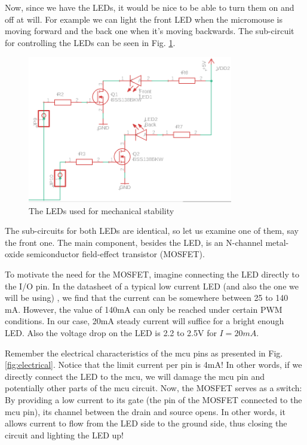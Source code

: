 Now, since we have the LEDs, it would be nice to be able to turn them on and off at will. For example we can light the front LED when the micromouse is moving forward and the back one when it's moving backwards.
The sub-circuit for controlling the LEDs can be seen in Fig. \ref{fig:leds}.

\begin{figure}[htb]
    \centering
    \includegraphics[width=0.8\textwidth]{figures/hardware/LEDs.PNG}
    \caption{The LEDs used for mechanical stability}
    \label{fig:leds}
\end{figure}

\FloatBarrier
\noindent
The sub-circuits for both LEDs are identical, so let us examine one of them, say the front one. The main component, besides the LED, is an N-channel metal-oxide semiconductor field-effect transistor (MOSFET).

To motivate the need for the MOSFET, imagine connecting the LED directly to the I/O pin. In the datasheet of a typical low current LED (and also the one we will be using) \cite{leds}, we find that the current can be somewhere between 25 to 140 mA. However, the value of 140mA can only be reached under certain PWM conditions. In our case, 20mA steady current will suffice for a bright enough LED. Also the voltage drop on the LED is 2.2 to 2.5V for $I = 20mA$.

Remember the electrical characteristics of the mcu pins as presented in Fig. \ref{fig:electrical}. Notice that the limit current per pin is 4mA! In other words, if we directly connect the LED to the mcu, we will damage the mcu pin and potentially other parts of the mcu circuit. 
Now, the MOSFET serves as a switch: By providing a low current to its gate (the pin of the MOSFET connected to the mcu pin), its channel between the drain and source opens. In other words, it allows current to flow from the LED side to the ground side, thus closing the circuit and lighting the LED up! 

